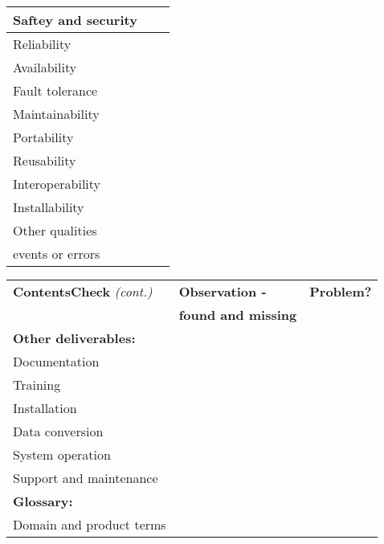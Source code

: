 \documentclass[a4paper]{article}
\begin{document}
\begin{tabular}{|l|l|l|}
		Saftey and security	&	&	\\ \hline
		Reliability	&	&	\\ \hline
		Availability	&	&	\\ \hline
		Fault tolerance	&	&	\\ \hline
		Maintainability	&	&	\\ \hline
		Portability	&	&	\\ \hline
		Reusability	&	&	\\ \hline
		Interoperability	&	&	\\ \hline
		Installability	&	&	\\ \hline
		Other qualities	&	&	\\ \hline
events or errors	&	&	\\ \hline
	\end{tabular}
	\newpage
	\begin{tabular}{|l|l|l|} \hline
		\textbf{ContentsCheck} \emph{(cont.)} & \textbf{Observation -} & \textbf{Problem?} \\
			& \textbf{found and missing}	&	\\ \hline
			\textbf{Other deliverables:}	&	&	\\
		Documentation	&	&	\\ \hline
		Training	&	&	\\ \hline
		Installation	&	&	\\ \hline
		Data conversion	&	&	\\ \hline
		System operation	&	&	\\ \hline
		Support and maintenance	&	&	\\ \hline
		\textbf{Glossary:}	&	&	\\
		Domain and product terms	&	&	\\ \hline
	\end{tabular}
\end{document}
